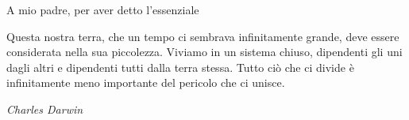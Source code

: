 \documentclass[a4paper,12pt]{report}
\newlength\corpo
\begin{document}
\begin{flushright}
\noindent
A mio padre, per aver detto l'essenziale
\end{flushright}
\cleardoublepage

\begin{flushright}
\noindent
Questa nostra terra, che un tempo ci sembrava infinitamente grande, deve essere considerata nella sua piccolezza. Viviamo in un sistema chiuso, dipendenti gli uni dagli altri e dipendenti tutti dalla terra stessa. Tutto ciò che ci divide è infinitamente meno importante del pericolo che ci unisce.

\textit{Charles Darwin}
\end{flushright}
\cleardoublepage

\tableofcontents
\listoffigures

\pagestyle{fancy}








\newpage 


 
\newpage 

\appendix
\linespread{1}

\end{document}
